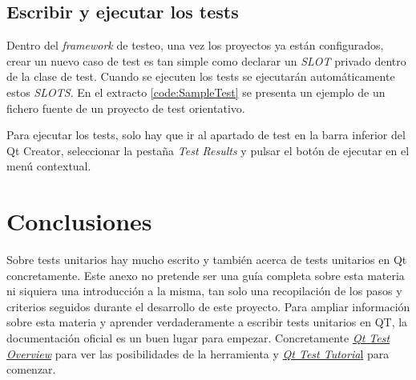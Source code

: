\subsection{Escribir y ejecutar los tests}

Dentro del \textit{framework} de testeo, una vez los proyectos ya están configurados, crear un nuevo caso de test es tan simple como declarar un \textit{SLOT} privado dentro de la clase de test. Cuando se ejecuten los tests  se ejecutarán automáticamente estos \textit{SLOTS}. En el extracto \ref{code:SampleTest} se presenta un ejemplo de un fichero fuente de un proyecto de test orientativo.


Para ejecutar los tests, solo hay que ir al apartado de test en la barra inferior del Qt Creator, seleccionar la pestaña \textit{Test Results} y pulsar el botón de ejecutar en el menú contextual.

\clearpage
\section{Conclusiones}

Sobre tests unitarios hay mucho escrito y también acerca de tests unitarios en Qt concretamente. Este anexo no pretende ser una guía completa sobre esta materia ni siquiera una introducción a la misma, tan solo una recopilación de los pasos y criterios seguidos durante el desarrollo de este proyecto. Para ampliar información sobre esta materia y aprender verdaderamente a escribir tests unitarios en QT, la documentación oficial es un buen lugar para empezar. Concretamente \href{https://doc.qt.io/qt-5/qtest-overview.html}{\textit{Qt Test Overview}} \cite{QTTestOverview} para ver las posibilidades de la herramienta y \href{https://doc.qt.io/qt-5/qtest-tutorial.html}{\textit{Qt Test Tutoria}l} \cite{QTTesTutorial} para comenzar.

\chapterend
